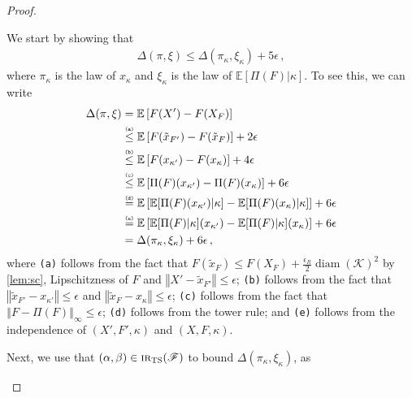 \documentclass[letter, 12pt]{report}
\newcommand{\epsR}{{\epsilon_R}}
\newcommand{\explan}[1]{\stackrel{\text{\tiny \texttt{#1}}}}
\newcommand{\norm}[1]{\left \Vert  #1 \right \Vert}
\newcommand{\E}{\mathbb E}
\newcommand{\cK}{\mathcal K}
\newcommand{\sF}{\mathscr F}
\newcommand{\diam}{\operatorname{diam}}
\newcommand{\1}{\mathbf{1}}
\newcommand{\IR}{\operatorname{\textsc{ir}}}
\newcommand{\ts}{\textsc{TS}\xspace}
\theoremstyle{plain}
\theoremstyle{definition}
\theoremstyle{remark}
\begin{document}
\begin{proof}
    \begin{enumsteps}
        \item \label{step:tsmain-1} We start by showing that
        \begin{align}
            \Delta(\pi, \xi) \leq \Delta(\pi_\kappa, \xi_\kappa) + 5\epsilon \,, \label{eq:tsmain-1}
        \end{align}
        where $\pi_\kappa$ is the law of $x_\kappa$ and $\xi_\kappa$ is the law of $\E[\Pi(F)|\kappa]$.
        To see this, we can write
        \begin{align*}
            \Delta(\pi, \xi)
             & =\E\left[F(X') - F(X_F)\right]                                                      \\
             & \explan{(a)}\leq\E\left[F(\tilde{x}_{F'}) - F(\tilde{x}_F)\right] + 2\epsilon       \\
             & \explan{(b)}\leq\E\left[F(x_{\kappa'}) - F(x_{\kappa})\right] + 4\epsilon           \\
             & \explan{(c)}\leq\E\left[\Pi(F)(x_{\kappa'}) - \Pi(F)(x_{\kappa})\right] + 6\epsilon \\
             & \explan{(d)}=\E\left[
                \E[\Pi(F)(x_{\kappa'})|\kappa] -
                \E[\Pi(F)(x_{\kappa})|\kappa]
            \right] + 6\epsilon                                                                    \\
             & \explan{(e)}=\E\left[
                \E[\Pi(F)|\kappa](x_{\kappa'}) -
                \E[\Pi(F)|\kappa](x_{\kappa})
            \right] + 6\epsilon                                                                    \\
             & =\Delta(\pi_\kappa, \xi_\kappa) + 6\epsilon\,,
        \end{align*}
        where \texttt{(a)} follows from the fact that $F(\tilde{x}_F) \leq F(X_F) + \tfrac{\epsR}{2}\diam(\cK)^2$ by \cref{lem:sc}, Lipschitzness of $F$ and $\norm{X' - \tilde{x}_{F'}} \leq \epsilon$;
        \texttt{(b)} follows from the fact that $\norm{\tilde{x}_{F'} - x_{\kappa'}} \leq \epsilon$ and $\norm{\tilde{x}_{F} - x_{\kappa}} \leq \epsilon$;
        \texttt{(c)} follows from the fact that $\norm{F - \Pi(F)}_\infty \leq \epsilon$;
        \texttt{(d)} follows from the tower rule;
        and \texttt{(e)} follows from the independence of $(X', F', \kappa)$ and $(X, F, \kappa)$.
        \item \label{step:tsmain-2} Next, we use that $(\alpha, \beta) \in \IR_\ts(\sF)$ to bound $\Delta(\pi_\kappa, \xi_\kappa)$, as

\end{enumsteps}
\end{proof}
\end{document}

